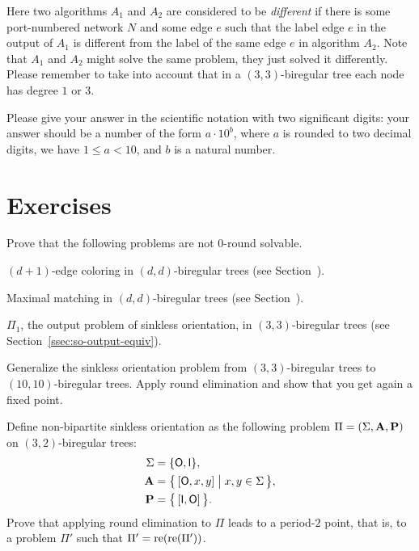 Here two algorithms $A_1$ and $A_2$ are considered to be \emph{different} if there is some port-numbered network $N$ and some edge $e$ such that the label edge $e$ in the output of $A_1$ is different from the label of the same edge $e$ in algorithm $A_2$. Note that $A_1$ and $A_2$ might solve the same problem, they just solved it differently. Please remember to take into account that in a $(3,3)$-biregular tree each node has degree $1$ or $3$.

Please give your answer in the scientific notation with two significant digits: your answer should be a number of the form  $a \cdot 10^b$, where $a$ is rounded to two decimal digits, we have $1 \le a < 10$, and $b$ is a natural number.

\section{Exercises}

\begin{ex}
	Prove that the following problems are not 0-round solvable. \begin{subex}
		\item $(d+1)$-edge coloring in $(d,d)$-biregular trees (see Section~).
		\item Maximal matching in $(d,d)$-biregular trees (see Section~).
		\item $\Pi_1$, the output problem of sinkless orientation, in $(3,3)$-biregular trees (see Section~\ref{ssec:so-output-equiv}).
	\end{subex} 
\end{ex}

\begin{ex}
	Generalize the sinkless orientation problem from $(3,3)$-biregular trees to $(10,10)$-biregular trees. Apply round elimination and show that you get again a fixed point.
\end{ex}

\begin{ex}
	Define non-bipartite sinkless orientation as the following problem $\Pi = (\Sigma, \mathbf{A}, \mathbf{P})$ on $(3,2)$-biregular trees:
	\begin{align*}
		\Sigma &= \{ \mathsf{O}, \mathsf{I} \}, \\
		\mathbf{A} &= \bigl\{\,  [\mathsf{O}, x, y ] \bigm| x,y \in \Sigma \,\bigr\}, \\
		\mathbf{P} &= \bigl\{\,  [\mathsf{I}, \mathsf{O}] \, \bigr\}.
	\end{align*}
	Prove that applying round elimination to $\Pi$ leads to a period-$2$ point, that is, to a problem $\Pi'$ such that $\Pi' = \operatorname{re}(\operatorname{re}(\Pi'))$.
\end{ex}

